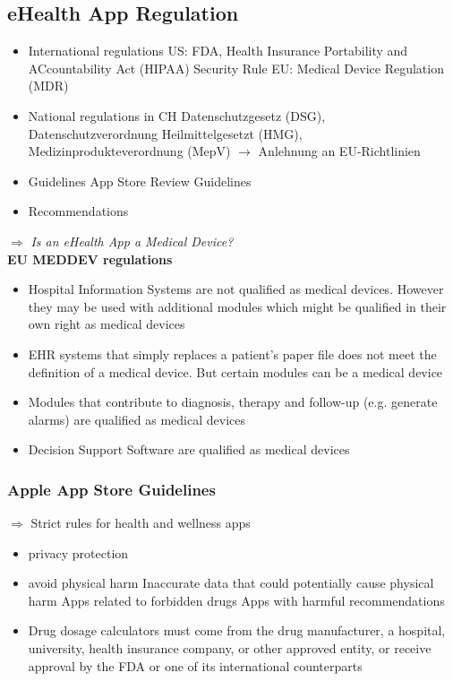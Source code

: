 \documentclass{report}
\theoremstyle{definition}
\theoremstyle{example}
\begin{document}
\subsection{eHealth App Regulation}
\begin{itemize}
   \item International regulations
   \subitem US: FDA, Health Insurance Portability and ACcountability Act (HIPAA) Security Rule
   \subitem EU: Medical Device Regulation (MDR)
   \item National regulations in CH
   \subitem Datenschutzgesetz (DSG), Datenschutzverordnung
   \subitem Heilmittelgesetzt (HMG), Medizinprodukteverordnung (MepV) $\rightarrow$ Anlehnung an EU-Richtlinien
   \item Guidelines
   \subitem App Store Review Guidelines
   \item Recommendations  
\end{itemize}

$\Rightarrow$ \textit{Is an eHealth App a Medical Device?}\\
\textbf{EU MEDDEV regulations}
\begin{itemize}
   \item Hospital Information Systems are not qualified as medical devices. However they may be used with additional modules which might be qualified in their own right as medical devices
   \item EHR systems that simply replaces a patient's paper file does not meet the definition of a medical device. But certain modules can be a medical device
   \item Modules that contribute to diagnosis, therapy and follow-up (e.g. generate alarms) are qualified as medical devices
   \item Decision Support Software are qualified as medical devices
\end{itemize}

\subsubsection{Apple App Store Guidelines}
$\Rightarrow$ Strict rules for health and wellness apps
\begin{itemize}
   \item privacy protection
   \item avoid physical harm
   \subitem Inaccurate data that could potentially cause physical harm
   \subitem Apps related to forbidden drugs
   \subitem Apps with harmful recommendations
   \item Drug dosage calculators must come from the drug manufacturer, a hospital, university, health insurance company, or other approved entity, or receive approval by the FDA or one of its international counterparts
\end{itemize}
\end{document}
